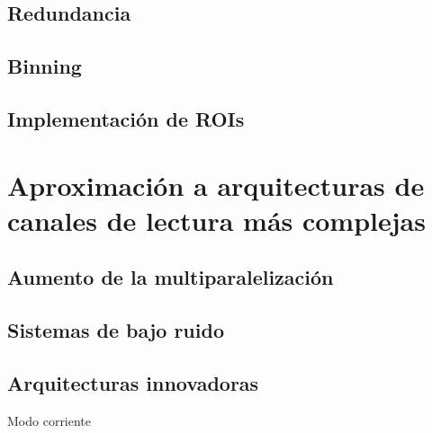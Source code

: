 \subsection{Redundancia}

\subsection{Binning}

\subsection{Implementación de ROIs}

\section{Aproximación a arquitecturas de canales de lectura más complejas}

\subsection{Aumento de la multiparalelización}

\subsection{Sistemas de bajo ruido}

\subsection{Arquitecturas innovadoras}
Modo corriente
